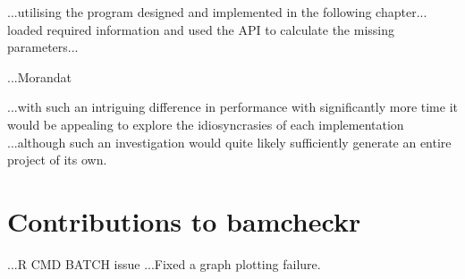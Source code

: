 ...utilising the program designed and implemented in the following chapter...
loaded required information and used the API to calculate the missing
parameters...

...Morandat\citep{morandat-rperf}

...with such an intriguing difference in performance with significantly more
time it would be appealing to explore the idiosyncrasies of each implementation
...although such an investigation would quite likely sufficiently generate an
entire project of its own.



\section{Contributions to bamcheckr}
...R CMD BATCH issue
...Fixed a graph plotting failure.

